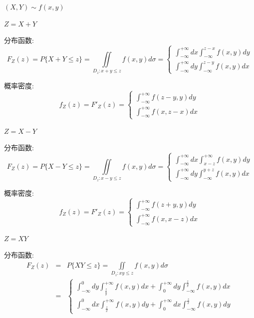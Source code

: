 \begin{definition}[连续型多维随机变量函数的分布]
	$(X,Y)\sim f(x,y)$
	
	\begin{figure}[H]
		\centering  %
	\end{figure}
	$Z=X+Y$
	
	分布函数: 
	$$F_{Z}(z)=P\{X+Y\leq z\}=\iint\limits_{D_{z}:x+y\leq z}f(x,y)d\sigma=\left\lbrace 
	\begin{array}{l}
		\int_{-\infty}^{+\infty}dx\int_{-\infty}^{z-x}f(x,y)dy\\
		\int_{-\infty}^{+\infty}dy\int_{-\infty}^{z-y}f(x,y)dx
	\end{array}
	\right. $$
	
	概率密度: 
	$$f_{Z}(z)=F'_{Z}(z)=\left\lbrace 
	\begin{array}{l}
		\int_{-\infty}^{+\infty}f(z-y,y)dy\\
		\int_{-\infty}^{+\infty}f(x,z-x)dx
	\end{array}
	\right. $$
	
	\begin{figure}[H]
		\centering  %
	\end{figure}
	$Z=X-Y$
	
	分布函数: 
	$$F_{Z}(z)=P\{X-Y\leq z\}=\iint\limits_{D_{z}:x-y\leq z}f(x,y)d\sigma=\left\lbrace 
	\begin{array}{l}
		\int_{-\infty}^{+\infty}dx\int_{x-z}^{+\infty}f(x,y)dy\\
		\int_{-\infty}^{+\infty}dy\int_{-\infty}^{y+z}f(x,y)dx
	\end{array}
	\right. $$
	
	概率密度: 
	$$f_{Z}(z)=F'_{Z}(z)=\left\lbrace 
	\begin{array}{l}
		\int_{-\infty}^{+\infty}f(z+y,y)dy\\
		\int_{-\infty}^{+\infty}f(x,x-z)dx
	\end{array}
	\right. $$
	
	\begin{figure}[H]
		\centering  %
	\end{figure}
	$Z=XY$
	
	分布函数: 
	\begin{eqnarray*}
		F_{Z}(z)&=&P\{XY\leq z\}=\iint\limits_{D_{z}:xy\leq z}f(x,y)d\sigma\\
		&=&\left\lbrace 
		\begin{array}{l}
			\int_{-\infty}^{0}dy\int_{\frac{z}{y}}^{+\infty}f(x,y)dx+\int_{0}^{+\infty}dy\int_{-\infty}^{\frac{z}{y}}f(x,y)dx\\
			\int_{-\infty}^{0}dx\int_{\frac{z}{x}}^{+\infty}f(x,y)dy+\int_{0}^{+\infty}dx\int_{-\infty}^{\frac{z}{x}}f(x,y)dy
		\end{array}
		\right.
	\end{eqnarray*}
	

\end{definition}
